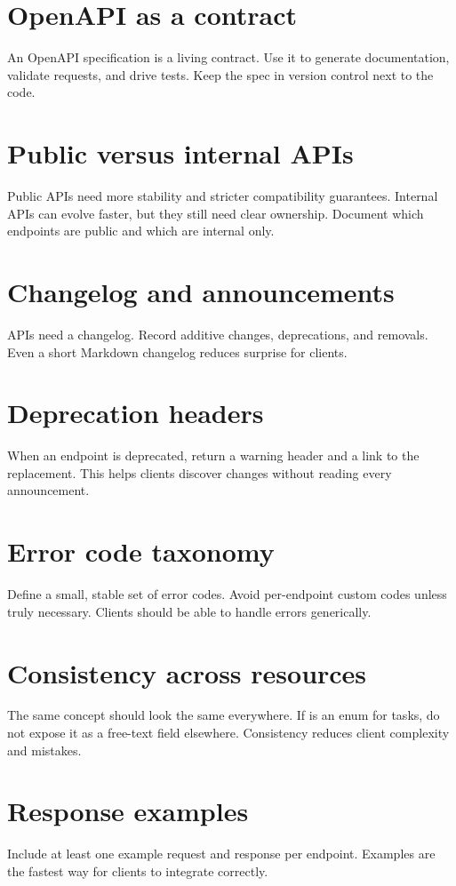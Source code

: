 \section{OpenAPI as a contract}
An OpenAPI specification is a living contract.
Use it to generate documentation, validate requests, and drive tests.
Keep the spec in version control next to the code.

\section{Public versus internal APIs}
Public APIs need more stability and stricter compatibility guarantees.
Internal APIs can evolve faster, but they still need clear ownership.
Document which endpoints are public and which are internal only.

\section{Changelog and announcements}
APIs need a changelog.
Record additive changes, deprecations, and removals.
Even a short Markdown changelog reduces surprise for clients.

\section{Deprecation headers}
When an endpoint is deprecated, return a warning header and a link to the replacement.
This helps clients discover changes without reading every announcement.

\section{Error code taxonomy}
Define a small, stable set of error codes.
Avoid per-endpoint custom codes unless truly necessary.
Clients should be able to handle errors generically.

\section{Consistency across resources}
The same concept should look the same everywhere.
If  is an enum for tasks, do not expose it as a free-text field elsewhere.
Consistency reduces client complexity and mistakes.

\section{Response examples}
Include at least one example request and response per endpoint.
Examples are the fastest way for clients to integrate correctly.

